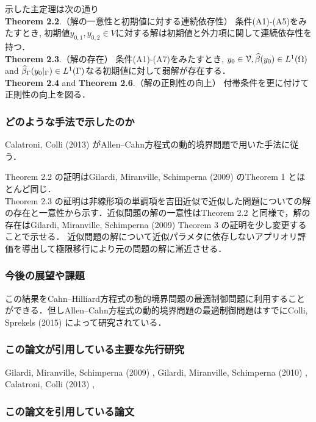 \documentclass[openary, a4paper, oneside]{jsarticle}
\begin{document}
	示した主定理は次の通り\\
	{\bf Theorem 2.2}.（解の一意性と初期値に対する連続依存性）
	条件(A1)-(A5)をみたすとき, 初期値$y_{0,1},y_{0,2}\in V$に対する解は初期値と外力項に関して連続依存性を持つ．\\
	{\bf Theorem 2.3}.（解の存在）
	条件(A1)-(A7)をみたすとき, $y_0\in \mathcal{V}, \widehat{\beta}(y_0)\in L^1(\Omega)$ and $\widehat{\beta}_{\Gamma}(y_0|_{\Gamma})\in L^1(\Gamma)$なる初期値に対して弱解が存在する．\\
	{\bf Theorem 2.4} and {\bf Theorem 2.6}.（解の正則性の向上）
	付帯条件を更に付けて正則性の向上を図る．
	\subsubsection{どのような手法で示したのか}
	Calatroni, Colli (2013) \cite{CalatroniColli2013} がAllen--Cahn方程式の動的境界問題で用いた手法に従う．\par
	Theorem 2.2 の証明はGilardi, Miranville, Schimperna (2009) \cite{GilardiMiranvilleSchimperna2009} のTheorem 1 とほとんど同じ．\\
	Theorem 2.3 の証明は非線形項の単調項を吉田近似で近似した問題についての解の存在と一意性から示す．近似問題の解の一意性はTheorem 2.2 と同様で，解の存在はGilardi, Miranville, Schimperna (2009) \cite{GilardiMiranvilleSchimperna2009} Theorem 3 の証明を少し変更することで示せる．
	近似問題の解について近似パラメタに依存しないアプリオリ評価を導出して極限移行により元の問題の解に漸近させる．
	
	\subsubsection{今後の展望や課題}
	この結果をCahn--Hilliard方程式の動的境界問題の最適制御問題に利用することができる．但しAllen--Cahn方程式の動的境界問題の最適制御問題はすでにColli, Sprekels (2015) \cite{ColliSprekels2015} によって研究されている．
	\subsubsection{この論文が引用している主要な先行研究}
	Gilardi, Miranville, Schimperna (2009) \cite{GilardiMiranvilleSchimperna2009},
	Gilardi, Miranville, Schimperna (2010) \cite{GilardiMiranvilleSchimperna2010},
	Calatroni, Colli (2013) \cite{CalatroniColli2013},

	\subsubsection{この論文を引用している論文}
\end{document}
